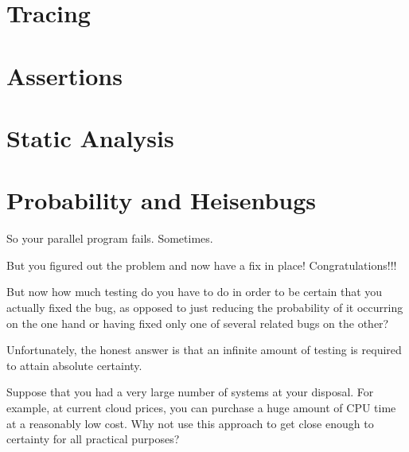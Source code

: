 

\section{Tracing}
\label{sec:debugging:Tracing}

\section{Assertions}
\label{sec:debugging:Assertions}

\section{Static Analysis}
\label{sec:debugging:Static Analysis}

\section{Probability and Heisenbugs}
\label{sec:analysis:Probability and Heisenbugs}

So your parallel program fails.
Sometimes.

But you figured out the problem and now have a fix in place!
Congratulations!!!

But now how much testing do you have to do in order to be certain that
you actually fixed the bug, as opposed to just reducing the probability
of it occurring on the one hand or having fixed only one of several
related bugs on the other?

Unfortunately, the honest answer is that an infinite amount of testing
is required to attain absolute certainty.

\QuickQuiz{}
	Suppose that you had a very large number of systems at your
	disposal.
	For example, at current cloud prices, you can purchase a
	huge amount of CPU time at a reasonably low cost.
	Why not use this approach to get close enough to certainty
	for all practical purposes?
 \QuickQuizEnd

